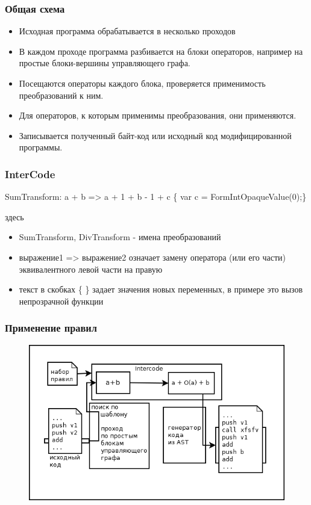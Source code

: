 \documentclass[10pt]{beamer}
\begin{document}
\begin{frame}
\frametitle{Общая схема}
\begin{itemize}
  \item Исходная программа обрабатывается в несколько проходов
  \item В каждом проходе программа разбивается на блоки операторов, например на простые блоки-вершины управляющего графа.
  \item Посещаются операторы каждого блока, проверяется применимость преобразований к ним.
  \item Для операторов, к которым применимы преобразования, они применяются.
  \item Записывается полученный байт-код или исходный код модифицированной программы.
\end{itemize}
\end{frame}

\begin{frame}
\frametitle{InterCode}
\begin{tcolorbox}[colback=green!5,colframe=green!40!black,title=пример]
SumTransform: a + b => a + 1 + b - 1 + c  \{ var c = FormIntOpaqueValue(0);\}
\end{tcolorbox}
здесь
\begin{itemize}
  \item SumTransform, DivTransform - имена преобразований
  \item выражение1 => выражение2 означает замену оператора (или его части) эквивалентного левой части на правую
  \item текст в скобках \{ \} задает значения новых переменных, в примере это вызов непрозрачной функции
\end{itemize}
\end{frame}


\begin{frame}
\frametitle{Применение правил}
\begin{figure}[H]
  \center
  \includegraphics[width=1.0\linewidth]{RuleApplication.png}
\end{figure}
\end{frame}
\end{document}
